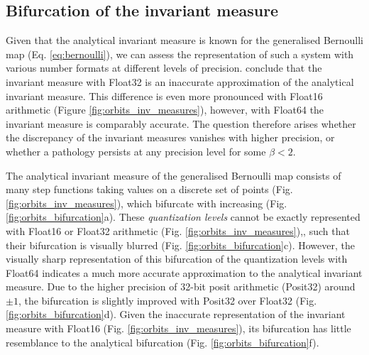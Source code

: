 \subsection{Bifurcation of the invariant measure}
\label{sec:bifurcation}

Given that the analytical invariant measure is known for the generalised Bernoulli map (Eq. \ref{eq:bernoulli}), we can assess
the representation of such a system with various number formats at different levels of precision. \cite{Boghosian2019} conclude
that the invariant measure with Float32 is an inaccurate approximation of the analytical invariant measure. This difference is even
more pronounced with Float16 arithmetic (Figure \ref{fig:orbits_inv_measures}), however, with Float64 the invariant measure is
comparably accurate. The question therefore arises whether the discrepancy of the invariant measures vanishes with higher precision,
or whether a pathology persists at any precision level for some $\beta < 2$.

The analytical invariant measure of the generalised Bernoulli map consists of many step functions taking values on a discrete set
of points (Fig. \ref{fig:orbits_inv_measures}), which bifurcate with increasing (Fig. \ref{fig:orbits_bifurcation}a). These \emph{quantization levels}
cannot be exactly represented with Float16 or Float32 arithmetic (Fig. \ref{fig:orbits_inv_measures}),, such that their bifurcation is visually
blurred (Fig. \ref{fig:orbits_bifurcation}c). However, the visually sharp representation of this bifurcation of the quantization levels with Float64
indicates a much more accurate approximation to the analytical invariant measure. Due to the higher precision of 32-bit posit arithmetic
(Posit32) around $\pm1$, the bifurcation is slightly improved with Posit32 over Float32 (Fig. \ref{fig:orbits_bifurcation}d). Given the
inaccurate representation of the invariant measure with Float16 (Fig. \ref{fig:orbits_inv_measures}), its bifurcation has little resemblance
to the analytical bifurcation (Fig. \ref{fig:orbits_bifurcation}f).

